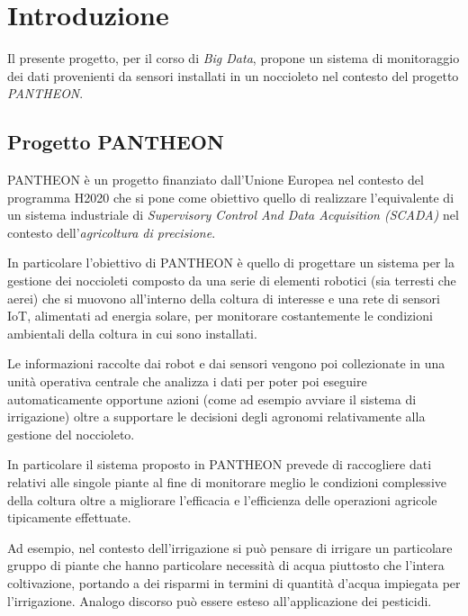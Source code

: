 \section{Introduzione}
Il presente progetto, per il corso di \textit{Big Data}, propone un sistema di monitoraggio dei dati provenienti da sensori installati in un noccioleto nel contesto del progetto \textit{PANTHEON}.\par

\subsection{Progetto PANTHEON}
PANTHEON è un progetto finanziato dall'Unione Europea nel contesto del programma H2020 che si pone come obiettivo quello di realizzare l'equivalente di un sistema industriale di \textit{Supervisory Control And Data Acquisition (SCADA)} nel contesto dell'\textit{agricoltura di precisione}.\par

In particolare l'obiettivo di PANTHEON è quello di progettare un sistema per la gestione dei noccioleti composto da una serie di elementi robotici (sia terresti che aerei) che si muovono all'interno della coltura di interesse e una rete di sensori IoT, alimentati ad energia solare, per monitorare costantemente le condizioni ambientali della coltura in cui sono installati.\par

Le informazioni raccolte dai robot e dai sensori vengono poi collezionate in una unità operativa centrale che analizza i dati per poter poi eseguire automaticamente opportune azioni (come ad esempio avviare il sistema di irrigazione) oltre a supportare le decisioni degli agronomi relativamente alla gestione del noccioleto.\par

In particolare il sistema proposto in PANTHEON prevede di raccogliere dati relativi alle singole piante al fine di monitorare meglio le condizioni complessive della coltura oltre a migliorare l'efficacia e l'efficienza delle operazioni agricole tipicamente effettuate.\par

Ad esempio, nel contesto dell'irrigazione si può pensare di irrigare un particolare gruppo di piante che hanno particolare necessità di acqua piuttosto che l'intera coltivazione, portando a dei risparmi in termini di quantità d'acqua impiegata per l'irrigazione. Analogo discorso può essere esteso all'applicazione dei pesticidi.\par

